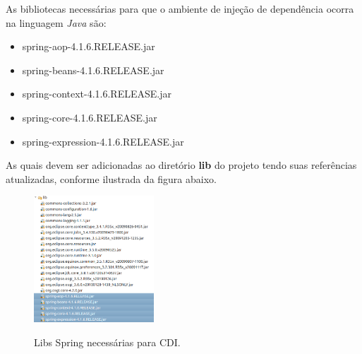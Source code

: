 As bibliotecas necessárias para que o ambiente de injeção de dependência ocorra na linguagem \textit{Java} são:
\begin{itemize}
	\item spring-aop-4.1.6.RELEASE.jar
	\item spring-beans-4.1.6.RELEASE.jar
	\item spring-context-4.1.6.RELEASE.jar
	\item spring-core-4.1.6.RELEASE.jar
	\item spring-expression-4.1.6.RELEASE.jar
\end{itemize}
\clearpage

As quais devem ser adicionadas ao diretório \textbf{lib} do projeto tendo suas referências atualizadas, conforme ilustrada da figura abaixo.\\
\begin{figure}[h]
	\center
	\includegraphics[width=0.4\textwidth]{Imagens/libsSpring}
	\label{ProjectAnalyser}
	\caption{Libs Spring necessárias para CDI.}
\end{figure}

